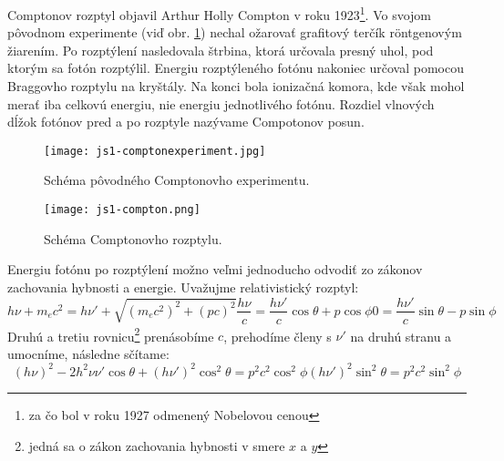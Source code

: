 \documentclass[../../main.tex]{subfiles}
\begin{document}
Comptonov rozptyl objavil Arthur Holly Compton v roku 1923\footnote{za čo bol v roku 1927 odmenený Nobelovou cenou}. Vo svojom pôvodnom experimente (viď obr. \ref{js1:img:experiment}) nechal ožarovať grafitový terčík r\"{o}ntgenovým žiarením. Po rozptýlení nasledovala štrbina, ktorá určovala presný uhol, pod ktorým sa fotón rozptýlil. Energiu rozptýleného fotónu nakoniec určoval pomocou Braggovho rozptylu na kryštály. Na konci bola ionizačná komora, kde však mohol merať iba celkovú energiu, nie energiu jednotlivého fotónu. Rozdiel vlnových dĺžok fotónov pred a po rozptyle nazývame Compotonov posun.

\begin{figure}[h!]
\centering
\texttt{[image: js1-comptonexperiment.jpg]}
\caption{Schéma pôvodného Comptonovho experimentu.}
\label{js1:img:experiment}
\end{figure}

\begin{figure}[h!]
\centering
\texttt{[image: js1-compton.png]}
\caption{Schéma Comptonovho rozptylu.}
\end{figure}

Energiu fotónu po rozptýlení možno veľmi jednoducho odvodiť zo zákonov zachovania hybnosti a energie. Uvažujme relativistický rozptyl:
\begin{subequations}
\begin{equation}
h\nu+m_ec^2=h\nu'+\sqrt{(m_ec^2)^2+(pc)^2}
\end{equation}
\label{js1:eq:compton}
\begin{equation}
\dfrac{h\nu}{c}=\dfrac{h\nu'}{c}\cos\theta+p\cos\phi
\end{equation}
\begin{equation}
0=\dfrac{h\nu'}{c}\sin\theta-p\sin\phi
\end{equation}
\end{subequations}
Druhú a tretiu rovnicu\footnote{jedná sa o zákon zachovania hybnosti v smere $x$ a $y$} prenásobíme $c$, prehodíme členy s $\nu'$ na druhú stranu a umocníme, následne sčítame:
\begin{subequations}
\begin{equation*}
(h\nu)^2-2h^2\nu\nu'\cos\theta+(h\nu')^2\cos^2\theta=p^2c^2\cos^2\phi
\end{equation*}
\begin{equation*}
(h\nu')^2\sin^2\theta=p^2c^2\sin^2\phi
\end{equation*}
\end{subequations}
\end{document}
